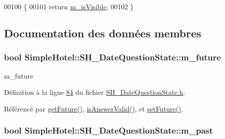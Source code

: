 \begin{DoxyCode}
00100                                \{
00101     \textcolor{keywordflow}{return} \hyperlink{classSimpleHotel_1_1SH__InOutState_a041ad53f3cdfb1b18ee002597e833848}{m\_isVisible};
00102 \}
\end{DoxyCode}


\subsection{Documentation des données membres}
\hypertarget{classSimpleHotel_1_1SH__DateQuestionState_a8b2bfdd1b7629d44a2001fd2e175cd8e}{
\subsubsection[{m\-\_\-future}]{\setlength{\rightskip}{0pt plus 5cm}bool Simple\-Hotel\-::\-S\-H\-\_\-\-Date\-Question\-State\-::m\-\_\-future\hspace{0.3cm}{\ttfamily [private]}}}\label{classSimpleHotel_1_1SH__DateQuestionState_a8b2bfdd1b7629d44a2001fd2e175cd8e}


m\-\_\-future 



Définition à la ligne \hyperlink{SH__DateQuestionState_8h_source_l00084}{84} du fichier \hyperlink{SH__DateQuestionState_8h_source}{S\-H\-\_\-\-Date\-Question\-State.\-h}.



Référencé par \hyperlink{classSimpleHotel_1_1SH__DateQuestionState_a5b9defa1f41f657e9a9a38171ac5666a}{get\-Future()}, \hyperlink{classSimpleHotel_1_1SH__DateQuestionState_a991fbb7c26a414d054780cd9a1e2221f}{is\-Answer\-Valid()}, et \hyperlink{classSimpleHotel_1_1SH__DateQuestionState_a85b9e8bde286e493bebbb3fdfb7da5e6}{set\-Future()}.

\hypertarget{classSimpleHotel_1_1SH__DateQuestionState_a6fba9a845913331c378e2c0e9afef2e7}{
\subsubsection[{m\-\_\-past}]{\setlength{\rightskip}{0pt plus 5cm}bool Simple\-Hotel\-::\-S\-H\-\_\-\-Date\-Question\-State\-::m\-\_\-past\hspace{0.3cm}{\ttfamily [private]}}}\label{classSimpleHotel_1_1SH__DateQuestionState_a6fba9a845913331c378e2c0e9afef2e7}


